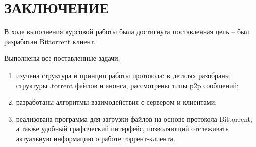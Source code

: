 \section*{ЗАКЛЮЧЕНИЕ}

В ходе выполнения курсовой работы была достигнута поставленная цель -- был разработан Bittorrent клиент.

Выполнены все поставленные задачи:
\begin{enumerate}
	\item изучена структура и принцип работы протокола: в деталях разобраны структуры .torrent файлов и анонса, рассмотрены типы p2p сообщений;
	
	\item разработаны алгоритмы взаимодействия с сервером и клиентами;
	
	\item реализована программа для загрузки файлов на основе протокола Bittorrent, а также удобный графический интерфейс, позволяющий отслеживать актуальную информацию о работе торрент-клиента.
\end{enumerate}


